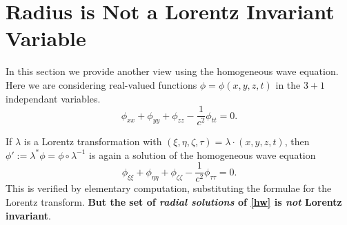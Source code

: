 \documentclass[12pt]{amsart}
\theoremstyle{definition}
\theoremstyle{remark}
\newcommand{\del}{\partial}
\begin{document}


\section{Radius is Not a Lorentz Invariant Variable}\label{wes}
In this section we provide another view using the homogeneous wave equation. Here we are considering real-valued functions $\phi=\phi(x,y,z,t)$ in the $3+1$ independant variables.
\begin{equation} \label{hw}
\phi_{xx}+\phi_{yy}+\phi_{zz}-\frac{1}{c^2}\phi_{tt}=0.
\end{equation} 

If $\lambda$ is a Lorentz transformation with $(\xi, \eta, \zeta, \tau)=\lambda \cdot (x,y,z,t)$, then $\phi':=\lambda^*\phi=\phi\circ\lambda^{-1}$ is again a solution of the homogeneous wave equation $$\phi_{\xi \xi}+\phi_{\eta \eta}+\phi_{\zeta \zeta}-\frac{1}{c^2}\phi_{\tau \tau}=0.$$ This is verified by elementary computation, substituting the formulae for the Lorentz transform. \textbf{But the set of \emph{radial solutions} of \eqref{hw} is \emph{not} Lorentz invariant}. 
\end{document}
